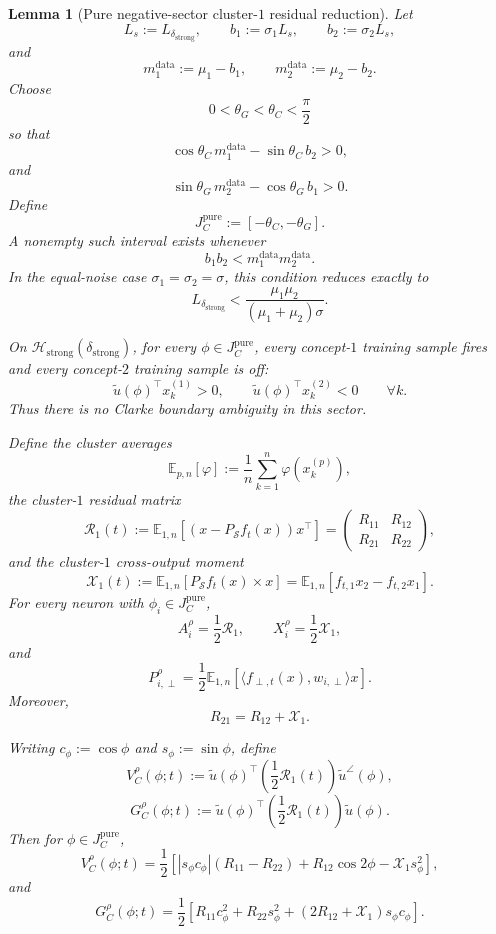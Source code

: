 \documentclass{article} %
\theoremstyle{plain}
\newtheorem{lemma}[theorem]{Lemma}
\theoremstyle{definition}
\theoremstyle{remark}
\begin{document}
\begin{lemma}[Pure negative-sector cluster-$1$ residual reduction]
\label{lem:negative-sector-residual-reduction}
Let
\[
L_s:=L_{\delta_{\mathrm{strong}}},
\qquad
b_1:=\sigma_1L_s,
\qquad
b_2:=\sigma_2L_s,
\]
and
\[
m_1^{\mathrm{data}}:=\mu_1-b_1,
\qquad
m_2^{\mathrm{data}}:=\mu_2-b_2.
\]
Choose
\[
0<\theta_G<\theta_C<\frac\pi2
\]
so that
\[
\boxed{
\cos\theta_C\,m_1^{\mathrm{data}}
-
\sin\theta_C\,b_2
>0,
}
\tag{C1}\label{eq:C1}
\]
and
\[
\boxed{
\sin\theta_G\,m_2^{\mathrm{data}}
-
\cos\theta_G\,b_1
>0.
}
\tag{C2}
\]
Define
\[
\boxed{
J_C^{\mathrm{pure}}
:=
[-\theta_C,-\theta_G].
}
\]
A nonempty such interval exists whenever
\[
\boxed{
b_1b_2
<
m_1^{\mathrm{data}}m_2^{\mathrm{data}}.
}
\tag{pure-sector-SNR}\label{eq:pure-sector-SNR}
\]
In the equal-noise case $\sigma_1=\sigma_2=\sigma$, this condition reduces
exactly to
\[
\boxed{
L_{\delta_{\mathrm{strong}}}
<
\frac{\mu_1\mu_2}{(\mu_1+\mu_2)\sigma}.
}
\tag{pure-sector-SNR-equal}
\]

On $\mathcal H_{\mathrm{strong}}(\delta_{\mathrm{strong}})$, for every
$\phi\in J_C^{\mathrm{pure}}$, every concept-$1$ training sample fires and
every concept-$2$ training sample is off:
\[
\boxed{
\widetilde u(\phi)^\top x_k^{(1)}>0,
\qquad
\widetilde u(\phi)^\top x_k^{(2)}<0
\qquad
\forall k.
}
\tag{pure-gates}\label{eq:pure-gates}
\]
Thus there is no Clarke boundary ambiguity in this sector.

Define the cluster averages
\[
\mathbb E_{p,n}[\varphi]
:=
\frac1n\sum_{k=1}^n\varphi(x_k^{(p)}),
\]
the cluster-$1$ residual matrix
\[
\boxed{
\mathcal R_1(t)
:=
\mathbb E_{1,n}
\left[
(x-P_{\mathcal S}f_t(x))x^\top
\right]
=
\begin{pmatrix}
R_{11}&R_{12}\\
R_{21}&R_{22}
\end{pmatrix},
}
\]
and the cluster-$1$ cross-output moment
\[
\boxed{
\mathcal X_1(t)
:=
\mathbb E_{1,n}
\left[
P_{\mathcal S}f_t(x)\times x
\right]
=
\mathbb E_{1,n}[f_{t,1}x_2-f_{t,2}x_1].
}
\]
For every neuron with $\phi_i\in J_C^{\mathrm{pure}}$,
\[
\boxed{
A_i^\rho
=
\frac12\mathcal R_1,
\qquad
X_i^\rho
=
\frac12\mathcal X_1,
}
\tag{pure-residual-reduction}\label{eq:pure-residual-reduction}
\]
and
\[
\boxed{
P_{i,\perp}^\rho
=
\frac12
\mathbb E_{1,n}
\left[
\langle f_{\perp,t}(x),w_{i,\perp}\rangle x
\right].
}
\]
Moreover,
\[
\boxed{
R_{21}=R_{12}+\mathcal X_1.
}
\tag{cross-identity}\label{eq:cross-identity}
\]

Writing
$c_\phi:=\cos\phi$ and $s_\phi:=\sin\phi$, define
\[
V_C^\rho(\phi;t)
:=
\widetilde u(\phi)^\top
\left(\frac12\mathcal R_1(t)\right)
\widetilde u^\angle(\phi),
\]
\[
G_C^\rho(\phi;t)
:=
\widetilde u(\phi)^\top
\left(\frac12\mathcal R_1(t)\right)
\widetilde u(\phi).
\]
Then for $\phi\in J_C^{\mathrm{pure}}$,
\[
\boxed{
V_C^\rho(\phi;t)
=
\frac12
\left[
|s_\phi c_\phi|(R_{11}-R_{22})
+
R_{12}\cos2\phi
-
\mathcal X_1s_\phi^2
\right],
}
\tag{pure-angular-field}\label{eq:pure-angular-field}
\]
and
\[
\boxed{
G_C^\rho(\phi;t)
=
\frac12
\left[
R_{11}c_\phi^2
+
R_{22}s_\phi^2
+
(2R_{12}+\mathcal X_1)s_\phi c_\phi
\right].
}
\tag{pure-radial-field}\label{eq:pure-radial-field}
\]


\end{lemma}
\end{document}
